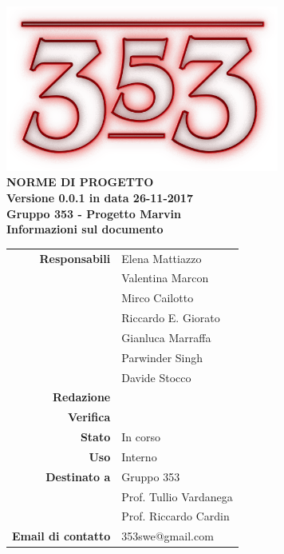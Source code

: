\documentclass[openany, a4paper, 12pt]{report}
\begin{document}
\begin{titlepage}
	\centering
	\vfill
	{
		\bfseries
		\vskip2cm
		\includegraphics[width=9cm]{../../common/images/logo.png} \\
		\vfill
		\Huge{NORME DI PROGETTO}\\
		\vfill
		\Large Versione 0.0.1 in data 26-11-2017\\
		\large Gruppo 353 - Progetto Marvin\\
		\vfill
		\normalsize Informazioni sul documento\\
		\begin{table}[htbp]
			\centering
			\renewcommand\arraystretch{1.2}
			\begin{tabular}{r|l}
				\hline
				\textbf{Responsabili}	& Elena Mattiazzo\\
										& Valentina Marcon\\
										& Mirco Cailotto\\
										& Riccardo E. Giorato\\
										& Gianluca Marraffa\\
										& Parwinder Singh\\
										& Davide Stocco\\
				
				\textbf{Redazione} 	& \\
				\textbf{Verifica} 	& \\	
				
				\textbf{Stato} 			& In corso\\
				\textbf{Uso}			& Interno\\
				\textbf{Destinato a}   	& Gruppo 353\\
				& Prof. Tullio Vardanega\\
				& Prof. Riccardo Cardin\\
				
				\textbf{Email di contatto}	& 353swe@gmail.com
			\end{tabular}
		\end{table}
		\vfill
	}    
\end{titlepage}

\tableofcontents
\newpage
{}




 
\end{document}
